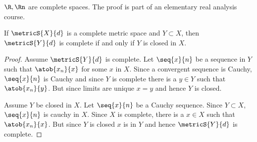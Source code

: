 \begin{Example}
    $\R,\Rn$ are complete spaces. The proof is part of an elementary real analysis course.
\end{Example}
\begin{Proposition}
    If $\metricS{X}{d}$ is a complete metric space and $Y \subset X$, then $\metricS{Y}{d}$ is complete if and
    only if $Y$ is closed in $X$.
\end{Proposition}
\begin{proof}
    Assume $\metricS{Y}{d}$ is complete. Let $\seq{x}{n}$ be a sequence in $Y$ such that $\atob{x_n}{x}$ for
    some $x$ in $X$. Since a convergent sequence is Cauchy, $\seq{x}{n}$ is Cauchy and since $Y$ is complete
    there is a $y \in Y$ such that $\atob{x_n}{y}$. But since limits are unique $x = y$ and hence $Y$ is
    closed.

    Assume $Y$ be closed in $X$. Let $\seq{x}{n}$ be a Cauchy sequence. Since $Y \subset X$, $\seq{x}{n}$ is
    cauchy in $X$. Since $X$ is complete, there is a $x\in X$ such that $\atob{x_n}{x}$. But since $Y$ is
    closed $x$ is in $Y$ and hence $\metricS{Y}{d}$ is complete.
\end{proof}

